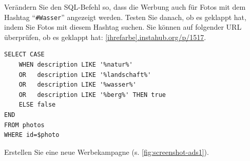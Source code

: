\begin{myexercise}
  Verändern Sie den SQL-Befehl so, dass die Werbung auch für Fotos mit dem Hashtag ``\texttt{\#Wasser}'' angezeigt werden. Testen Sie danach, ob es geklappt hat, indem Sie Fotos mit diesem Hashtag suchen. Sie können auf folgender URL überprüfen, ob es geklappt hat: \url{[ihrefarbe].instahub.org/p/1517}.
  \begin{myanswer}
    \begin{lstlisting}[style=sql]
SELECT CASE 
	WHEN description LIKE '%natur%' 
	OR   description LIKE '%landschaft%' 
	OR   description LIKE '%wasser%' 
	OR   description LIKE '%berg%' THEN true 
	ELSE false 
END 
FROM photos 
WHERE id=$photo
\end{lstlisting}
  \end{myanswer}
\end{myexercise}

\begin{mychallenge}
  Erstellen Sie eine neue Werbekampagne (s. \cref{fig:screenshot-ads1}).
\end{mychallenge}

